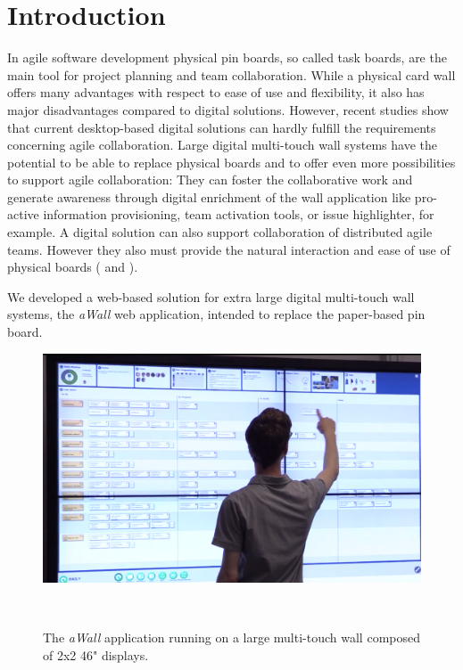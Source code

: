 \documentclass{sigchi}
\begin{document}



\section{Introduction}
In agile software development physical pin boards, so called task boards, are the main tool for  project planning and team collaboration. While a physical card wall offers many advantages with respect to ease of use and flexibility, it also has major disadvantages compared to digital solutions. However, recent studies \cite{udcw:31721, Mateescu:2015, Kropp:2015} show that current desktop-based digital solutions can hardly fulfill the requirements concerning agile collaboration.
Large digital multi-touch wall systems have the potential to be able to replace physical boards and to offer even more possibilities to support agile collaboration: They can foster the collaborative work and generate awareness through digital enrichment of the wall application like pro-active information provisioning, team activation tools, or issue highlighter, for example. A digital solution can also support collaboration of distributed agile teams. However they also must provide the natural interaction and ease of use of physical boards (\cite{udcw:31721} and \cite{Mateescu:2015}). 


We developed a web-based solution for extra large digital multi-touch wall systems, the \textit{aWall} web application, intended to replace the paper-based pin board. 
\begin{figure}
	\centering
	\includegraphics[width=\columnwidth]{figures/awall}
	\caption{The \textit{aWall} application running on a large multi-touch wall composed of 2x2 46" displays.}
	~\label{fig:awall}
\end{figure}
\end{document}
